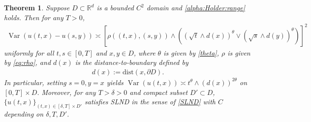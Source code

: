 \documentclass[reqno]{amsart}
\DeclareMathOperator{\Var}{Var}
\newcommand{\R}{\mathbb R}
\newcommand{\1}{\mathbf 1}
\numberwithin{equation}{section}
\newtheorem{theorem}{Theorem}[section]
\theoremstyle{definition}
\begin{document}
\begin{theorem}\label{thm:optimal}
Suppose $D \subset \R^d$ is a bounded $C^2$ domain and \eqref{alpha:Holder:range} holds.
Then for any $T>0$,
\begin{align}\label{var:u-u}
	\Var(u(t,x)-u(s,y)) \asymp \left[\rho((t,x),(s,y)) \wedge \left((\sqrt{t} \wedge d(x))^\theta \vee (\sqrt{s} \wedge d(y))^\theta\right)\right]^2
\end{align}
uniformly for all $t,s \in [0,T]$ and $x,y \in D$, where $\theta$ is given by \eqref{theta}, $\rho$ is given by \eqref{eq:rho}, and $d(x)$ is the distance-to-boundary defined by
\begin{align}\label{d(x)}
	d(x):= \mathrm{dist}(x,\partial D).
\end{align}
In particular, setting $s=0,y=x$ yields $\Var(u(t,x)) \asymp t^{\theta} \wedge (d(x))^{2\theta}$ on $[0,T]\times D$.
Moreover, for any $T>\delta>0$ and compact subset $D' \subset D$, $\{u(t,x)\}_{(t,x) \in [\delta,T]\times D'}$ satisfies SLND in the sense of \eqref{SLND} with $C$ depending on $\delta,T,D'$.
\end{theorem}


\end{document}
